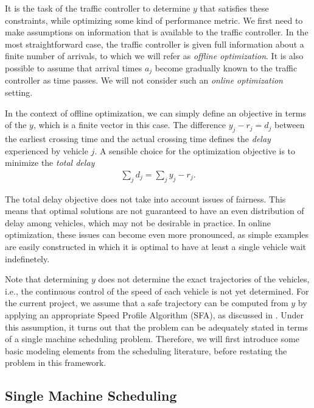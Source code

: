 \documentclass{article}
\theoremstyle{definition}
\theoremstyle{plain}
\begin{document}
It is the task of the traffic controller to determine $y$ that satisfies these
constraints, while optimizing some kind of performance metric. We first need to
make assumptions on information that is available to the traffic controller. In
the most straightforward case, the traffic controller is given full information
about a finite number of arrivals, to which we will refer as \textit{offline
  optimization}. It is also possible to assume that arrival times $a_{j}$ become
gradually known to the traffic controller as time passes. We will not consider
such an \textit{online optimization} setting.

In the context of offline optimization, we can simply define an objective in
terms of the $y$, which is a finite vector in this case. The difference
$y_{j} - r_{j} = d_{j}$ between the earliest crossing time and the actual
crossing time defines the \textit{delay} experienced by vehicle $j$. A sensible
choice for the optimization objective is to minimize the \textit{total delay}
\begin{align}
  \label{eq:total-delay}
  \sum_{j} d_{j} = \sum_{j} y_{j} - r_{j} .
\end{align}

The total delay objective does not take into account issues of fairness. This
means that optimal solutions are not guaranteed to have an even distribution of
delay among vehicles, which may not be desirable in practice. In online
optimization, these issues can become even more pronounced, as simple examples
are easily constructed in which it is optimal to have at least a single vehicle
wait indefinetely.

Note that determining $y$ does not determine the exact trajectories of the
vehicles, i.e., the continuous control of the speed of each vehicle is not yet
determined. For the current project, we assume that a safe trajectory can be
computed from $y$ by applying an appropriate Speed Profile Algorithm (SFA), as
discussed in \cite{timmermanPlatoonFormingAlgorithms2021}. Under this
assumption, it turns out that the problem can be adequately stated in terms of a
single machine scheduling problem. Therefore, we will first introduce some basic
modeling elements from the scheduling literature, before restating the problem
in this framework.

\subsection{Single Machine Scheduling}
\end{document}
